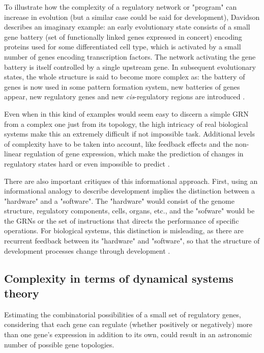 To illustrate how the complexity of a regulatory network or "program" can increase in evolution (but a similar case could be said for development), Davidson describes an imaginary example:
an early evolutionary state consists of a small gene battery (set of functionally linked genes expressed in concert) encoding proteins used for some differentiated cell type, which is activated by a small number of genes encoding transcription factors. The network activating the gene battery is itself controlled by a single upstream gene.
In subsequent evolutionary states, the whole structure is said to become more complex as: the battery of genes is now used in some pattern formation system, new batteries of genes appear, new regulatory genes and new \textit{cis}-regulatory regions are introduced  \citep{Davidson2001}.

Even when in this kind of examples would seem easy to discern a simple GRN from a complex one just from its topology, the high intricacy of real biological systems make this an extremely difficult if not impossible task. 
Additional levels of complexity have to be taken into account, like feedback effects and the non-linear regulation of gene expression, which make the prediction of changes in regulatory states hard or even impossible to predict \citep{Jaeger2014devmech}.

There are also important critiques of this informational approach. First, using an informational analogy to describe development implies the distinction between a "hardware" and a "software".
The "hardware" would consist of the genome structure, regulatory components, cells, organs, etc., and the "sofware" would be the GRNs or the set of instructions that directs the performance of specific operations.
For biological systems, this distinction is misleading, as there are recurrent feedback between its "hardware" and "software", so that the structure of development processes change through development \citep{susan2000ontogeny,Salazar-Ciudad2009,Jaeger2014devmech}.


\subsection{Complexity in terms of dynamical systems theory}

Estimating the combinatorial possibilities of a small set of regulatory genes, considering that each gene can regulate (whether positively or negatively) more than one gene's expression in addition to its own, could result in an astronomic number of possible gene topologies.




